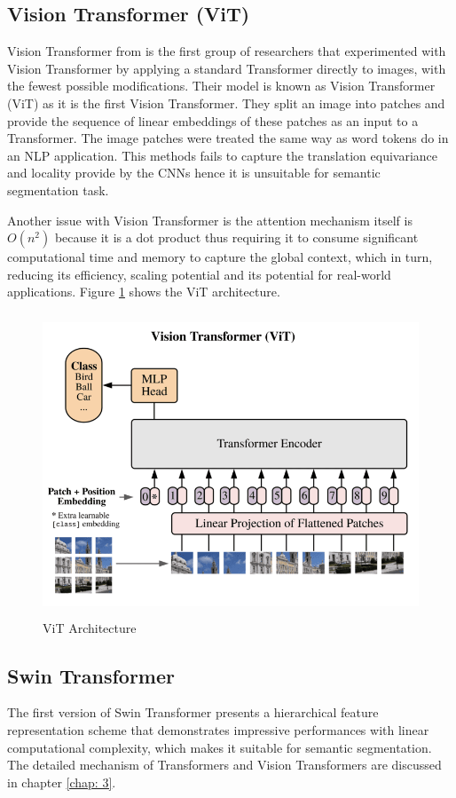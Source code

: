 \subsection{Vision Transformer (ViT)}
Vision Transformer from \cite{16x16} is the first group of researchers that experimented with Vision Transformer by applying a standard Transformer directly to images, with the fewest possible modifications. Their model is known as Vision Transformer (ViT) as it is the first Vision Transformer. They split an image into patches and provide the sequence of linear embeddings of these patches as an input to a Transformer. The image patches were treated the same way as word tokens do in an NLP application. This methods fails to capture the  translation equivariance and locality provide by the CNNs hence it is unsuitable for semantic segmentation task.

Another issue with Vision Transformer is the attention mechanism itself is $O(n^2)$ because it is a dot product thus requiring it to consume significant computational time and memory to capture the global context, which in turn, reducing its efficiency, scaling potential and its potential for real-world applications. Figure \ref{fig:vit} shows the ViT architecture.

\begin{figure}[ht]
\includegraphics[width=13.5cm, height=9cm]{images/vision transformer.png}
\centering
\caption{ViT Architecture}
\label{fig:vit}
\end{figure}

\subsection{Swin Transformer}
The first version of Swin Transformer \cite{swin-v1} presents a hierarchical feature representation scheme that demonstrates impressive performances with linear computational complexity, which makes it suitable for semantic segmentation. The detailed mechanism of Transformers and Vision Transformers are discussed in chapter \ref{chap: 3}.

